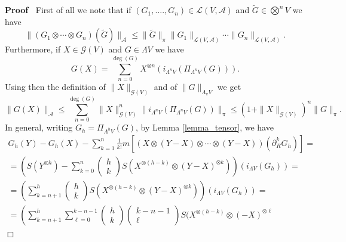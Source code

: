 \documentclass[11pt]{article}
\newenvironment{proof}{\noindent\textbf{Proof\ }}{\hspace*{\fill}$\Box$\medskip}
\begin{document}
\begin{proof}
  First of all we note that if $(G_1, \ldots ., G_n) \in \mathcal{L} (V,
  \mathcal{A})$ and $\tilde{G} \in \bigotimes^n V$ we have
  \begin{equation}
    \| (G_1 \otimes \cdots \otimes G_n) (\tilde{G}) \|_{\mathcal{A}} \leqslant
    \| \tilde{G} \|_{\pi} \| G_1 \|_{\mathcal{L} (V, \mathcal{A})} \cdots \|
    G_n \|_{\mathcal{L} (V, \mathcal{A})} ._{} \label{eq:inequalitytensor}
  \end{equation}
  Furthermore, if $X \in \mathcal{G} (V)$ and $G \in \Lambda V$ we have
  \[ G (X) = \sum^{\deg (G)}_{n = 0} X^{\otimes n} (i_{\Lambda^n V}
     (\Pi_{\Lambda^n V} (G))) . \]
  Using then the definition of $\| X \|_{\mathcal{G} (V)}$ and of $\| G
  \|_{\Lambda_{\pi} V}$ we get
  \[ \| G (X) \|_{\mathcal{A}} \leqslant \sum_{n = 0}^{\deg (G)} \| X
     \|_{\mathcal{G} (V)}^n \| i_{\Lambda^n V} (\Pi_{\Lambda^n V} (G))
     \|_{\pi} \leqslant (1 + \| X \|_{\mathcal{G} (V)})^n \| G \|_{\pi} . \]
  In general, writing $G_h = \Pi_{\Lambda^h V} (G)$, by Lemma
  \ref{lemma_tensor}, we have
  \begin{equation}
    \begin{array}{c}
      G_h (Y) - G_h (X) - \sum_{k = 1}^n \frac{1}{k!} m [(X \otimes (Y - X)
      \otimes \cdots \otimes (Y - X)) (\partial_R^k G_h)] =\\
      = \left( S (Y^{\otimes h}) - \sum_{k = 0}^n \left( \begin{array}{c}
        h\\
        k
      \end{array} \right) S (X^{\otimes (h - k)} \otimes (Y - X)^{\otimes k})
      \right) (i_{\Lambda V} (G_h)) =\\
      = \left( \sum_{k = n + 1}^h \left( \begin{array}{c}
        h\\
        k
      \end{array} \right) S (X^{\otimes (h - k)} \otimes (Y - X)^{\otimes k})
      \right) (i_{\Lambda V} (G_h)) =\\
      = \left. \left. \left( \sum_{k = n + 1}^h \sum_{\ell = 0}^{k - n - 1}
      \left( \begin{array}{c}
        h\\
        k
      \end{array} \right) \left( \begin{array}{c}
        k - n - 1\\
        \ell
      \end{array} \right) S (X^{\otimes (h - k)} \otimes (- X)^{\otimes \ell}

\end{array}
\end{equation}
\end{proof}
\end{document}

